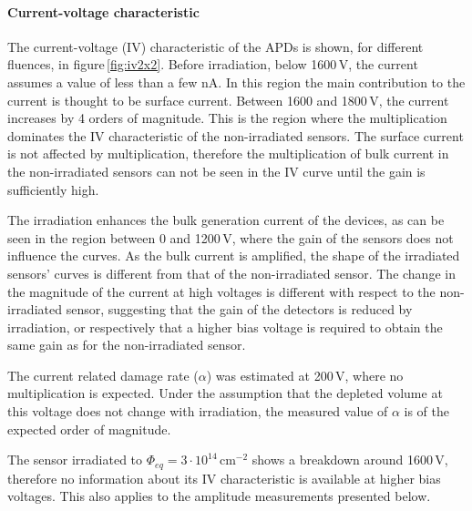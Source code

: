 \documentclass{article}
\begin{document}
\paragraph{Current-voltage characteristic}
The current-voltage (IV) characteristic of the APDs is shown, for different fluences, in figure\,\ref{fig:iv2x2}.
Before irradiation, below 1600\,V, the current assumes a value of less than a few nA.
In this region the main contribution to the current is thought to be surface current.
Between 1600 and 1800\,V, the current increases by 4 orders of magnitude.
This is the region where the multiplication dominates the IV characteristic of the non-irradiated sensors.
The surface current is not affected by multiplication, therefore the multiplication of bulk current in the non-irradiated sensors can not be seen in the IV curve until the gain is sufficiently high.

The irradiation enhances the bulk generation current of the devices, as can be seen in the region between 0 and 1200\,V, where the gain of the sensors does not influence the curves.
As the bulk current is amplified, the shape of the irradiated sensors' curves is different from that of the non-irradiated sensor.
The change in the magnitude of the current at high voltages is different with respect to the non-irradiated sensor, suggesting that the gain of the detectors is reduced by irradiation, or respectively that a higher bias voltage is required to obtain the same gain as for the non-irradiated sensor.

The current related damage rate ($\alpha$) was estimated at 200\,V, where no multiplication is expected.
Under the assumption that the depleted volume at this voltage does not change with irradiation, the measured value of $\alpha$ is of the expected order of magnitude.

The sensor irradiated to $\Phi_{eq} = 3 \cdot 10^{14}$\,cm$^{-2}$ shows a breakdown around 1600\,V, therefore no information about its IV characteristic is available at higher bias voltages.
This also applies to the amplitude measurements presented below.
\end{document}

